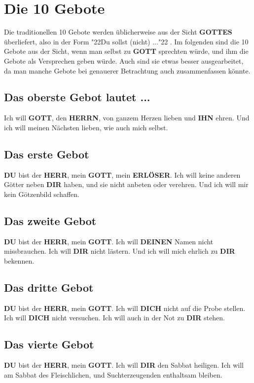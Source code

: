 \documentclass[12pt,a4paper]{article}
\newcommand{\Deinen}[0]{\textbf{DEINEN}}
\newcommand{\Dich}[0]{\textbf{DICH}}
\newcommand{\Dir}[0]{\textbf{DIR}}
\newcommand{\Du}[0]{\textbf{DU}}
\newcommand{\Erloeser}[0]{\textbf{ERL\"OSER}}
\newcommand{\Gottes}[0]{\textbf{GOTTES}}
\newcommand{\Gott}[0]{\textbf{GOTT}}
\newcommand{\Herrn}[0]{\textbf{HERRN}}
\newcommand{\Herr}[0]{\textbf{HERR}}
\newcommand{\Ihn}[0]{\textbf{IHN}}
\newcommand{\q}[1]{\char"22{#1}\char"22 }
\begin{document}
	\section{Die 10 Gebote}
		Die traditionellen 10 Gebote werden \"ublicherweise aus der Sicht {\Gottes} \"uberliefert,
		also in der Form \q{Du sollst (nicht) ...}.
		Im folgenden sind die 10 Gebote aus der Sicht,
		wenn man selbst zu {\Gott} sprechten w\"urde,
		und ihm die Gebote als Versprechen geben w\"urde.
		Auch sind sie etwas besser ausgearbeitet,
		da man manche Gebote bei genauerer Betrachtung auch zusammenfassen k\"onnte.
	
	\subsection{Das oberste Gebot lautet ...}
		Ich will {\Gott}, den {\Herrn}, von ganzem Herzen lieben und {\Ihn} ehren. Und ich will meinen N\"achsten lieben, wie auch mich selbst.
		
	\subsection{Das erste Gebot}
		{\Du} bist der {\Herr},
		mein {\Gott},
		mein {\Erloeser}.
		Ich will keine anderen G\"otter neben {\Dir} haben,
		und sie nicht anbeten oder verehren.
		Und ich will mir kein G\"otzenbild schaffen.
		
	\subsection{Das zweite Gebot}
		{\Du} bist der {\Herr},
		mein {\Gott}.
		Ich will {\Deinen} Namen nicht missbrauchen.
		Ich will {\Dir} nicht l\"astern.
		Und ich will mich ehrlich zu {\Dir} bekennen.
			
	\subsection{Das dritte Gebot}
		{\Du} bist der {\Herr},
		mein {\Gott}.
		Ich will {\Dich} nicht auf die Probe stellen.
		Ich will {\Dich} nicht versuchen.
		Ich will auch in der Not zu {\Dir} stehen.
		
	\subsection{Das vierte Gebot}
		{\Du} bist der {\Herr},
		mein {\Gott}.
		Ich will {\Dir} den Sabbat heiligen.
		Ich will am Sabbat des Fleischlichen,
		und Suchterzeugenden enthaltsam bleiben.
		
\end{document}
